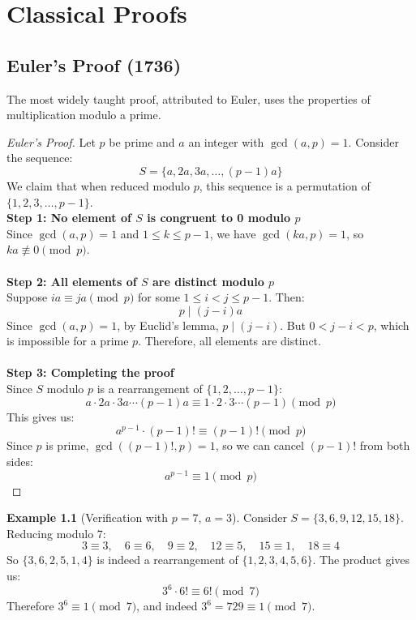 \documentclass[12pt,openany]{book}
\theoremstyle{definition}
\newtheorem{example}{Example}[chapter]
\theoremstyle{plain}
\theoremstyle{remark}
\begin{document}
\chapter{Classical Proofs}

\section{Euler's Proof (1736)}

The most widely taught proof, attributed to Euler, uses the properties of multiplication modulo a prime.

\begin{proof}[Euler's Proof]
Let $p$ be prime and $a$ an integer with $\gcd(a,p) = 1$. Consider the sequence:
\[
S = \{a, 2a, 3a, \ldots, (p-1)a\}
\]
\noindent
We claim that when reduced modulo $p$, this sequence is a permutation of $\{1, 2, 3, \ldots, p-1\}$.
\noindent
\\
\textbf{Step 1: No element of $S$ is congruent to 0 modulo $p$}
\noindent
\\
Since $\gcd(a,p) = 1$ and $1 \leq k \leq p-1$, we have $\gcd(ka,p) = 1$, so $ka \not\equiv 0 \pmod{p}$.
\noindent
\\
\\
\textbf{Step 2: All elements of $S$ are distinct modulo $p$}
\noindent
\\
Suppose $ia \equiv ja \pmod{p}$ for some $1 \leq i < j \leq p-1$. Then:
\[
p \mid (j-i)a
\]
\noindent
Since $\gcd(a,p) = 1$, by Euclid's lemma, $p \mid (j-i)$. But $0 < j-i < p$, which is impossible for a prime $p$. Therefore, all elements are distinct.
\noindent
\\
\\
\textbf{Step 3: Completing the proof}
\noindent
\\
Since $S$ modulo $p$ is a rearrangement of $\{1, 2, \ldots, p-1\}$:
\[
a \cdot 2a \cdot 3a \cdots (p-1)a \equiv 1 \cdot 2 \cdot 3 \cdots (p-1) \pmod{p}
\]
\noindent
This gives us:
\[
a^{p-1} \cdot (p-1)! \equiv (p-1)! \pmod{p}
\]
\noindent
Since $p$ is prime, $\gcd((p-1)!, p) = 1$, so we can cancel $(p-1)!$ from both sides:
\[
a^{p-1} \equiv 1 \pmod{p}
\]
\end{proof}


\begin{example}[Verification with $p=7$, $a=3$]
Consider $S = \{3, 6, 9, 12, 15, 18\}$. Reducing modulo 7:
\[
3 \equiv 3, \quad 6 \equiv 6, \quad 9 \equiv 2, \quad 12 \equiv 5, \quad 15 \equiv 1, \quad 18 \equiv 4
\]
\noindent
So $\{3, 6, 2, 5, 1, 4\}$ is indeed a rearrangement of $\{1, 2, 3, 4, 5, 6\}$.
The product gives us:
\[
3^6 \cdot 6! \equiv 6! \pmod{7}
\]
\noindent
Therefore $3^6 \equiv 1 \pmod{7}$, and indeed $3^6 = 729 \equiv 1 \pmod{7}$.
\end{example}
\end{document}
